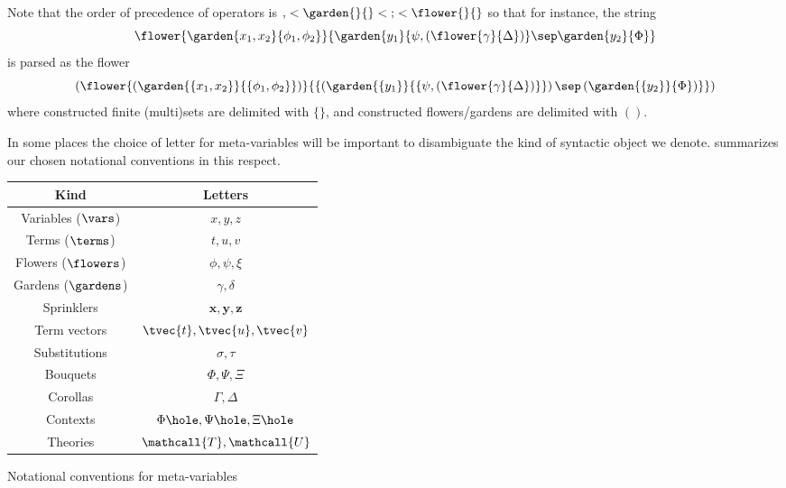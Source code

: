 Note that the order of precedence of operators is
$\mathop{,} < \garden{{}}{{}} < \mathop{;} < \mathop{\flower{}{}}$
so that for instance, the string
$$\flower{\garden{x_1, x_2}{\phi_1, \phi_2}}{\garden{y_1}{\psi, (\flower{\gamma}{\Delta})} \sep \garden{y_2}{\Phi}}$$
is parsed as the flower
$$\left(\flower{\left(\garden{\{x_1, x_2\}}{\{\phi_1,
\phi_2\}}\right)}{\{\left(\garden{\{y_1\}}{\{\psi,
\left(\flower{\gamma}{\Delta}\right)\}}\right) \sep
\left(\garden{\{y_2\}}{\Phi}\right)\}}\right)$$ where constructed finite
(multi)sets are delimited with $\{\}$, and constructed flowers/gardens are
delimited with $()$.


\begin{remark}
  In some places the choice of letter for meta-variables will be important to
  disambiguate the kind of syntactic object we denote. 
  summarizes our chosen notational conventions in this respect.
\end{remark}

\begin{marginfigure}
  \centering
  \begin{tabular}{|c|c|}
    \hline
    \bfseries Kind & \bfseries Letters \\
    \hline
    Variables ($\vars$) & $x, y, z$ \\
    Terms ($\terms$) & $t, u, v$ \\
    Flowers ($\flowers$) & $\phi, \psi, \xi$ \\
    Gardens ($\gardens$) & $\gamma, \delta$ \\
    Sprinklers & $\mathbf{x}, \mathbf{y}, \mathbf{z}$ \\
    Term vectors & $\tvec{t}, \tvec{u}, \tvec{v}$ \\
    Substitutions & $\sigma, \tau$ \\
    Bouquets & $\Phi, \Psi, \Xi$ \\
    Corollas & $\Gamma, \Delta$ \\
    Contexts & $\Phi\hole, \Psi\hole, \Xi\hole$ \\
    Theories & $\mathcall{T}, \mathcall{U}$ \\
    \hline
  \end{tabular}
  \caption{Notational conventions for meta-variables}
\end{marginfigure}

